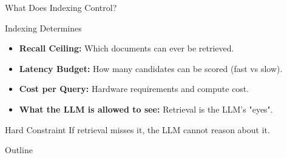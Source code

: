 \documentclass[aspectratio=169]{beamer}
\begin{document}
\begin{frame}{What Does Indexing Control?}
\begin{block}{Indexing Determines}
\begin{itemize}
    \item \textbf{Recall Ceiling:} Which documents can ever be retrieved.
    \item \textbf{Latency Budget:} How many candidates can be scored (fast vs slow).
    \item \textbf{Cost per Query:} Hardware requirements and compute cost.
    \item \textbf{What the LLM is allowed to see:} Retrieval is the LLM's "eyes".
\end{itemize}
\end{block}

\vspace{1em}

\begin{center}

\end{center}

\vspace{0.5em}

\begin{alertblock}{Hard Constraint}
If retrieval misses it, the LLM cannot reason about it.
\end{alertblock}
\end{frame}




\begin{frame}{Outline}
\tableofcontents
\end{frame}
\end{document}
